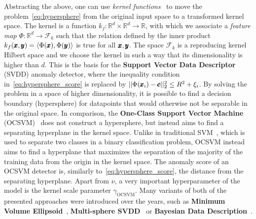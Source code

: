 Abstracting the above, one can use \textit{kernel functions}~\cite{shawe2004kernel} to move the problem~\eqref{eq:hypersphere} from the original input space to a transformed kernel space. The kernel is a function $k_f:\mathbb{R}^d \times \mathbb{R}^d \rightarrow \mathbb{R}$, with which we associate a \textit{feature map} $\Phi: \mathbb{R}^d \rightarrow \mathcal{F}_k$ such that the relation defined by the inner product $k_f(\pmb{{x}},\pmb{{y}})=\langle \Phi(\pmb{{x}}), \Phi(\pmb{{y}}) \rangle$ is true for all $\pmb{{x}},\pmb{{y}}$. The space $\mathcal{F}_k$ is a reproducing kernel Hilbert space and we choose the kernel in such a way that its dimensionality is higher than $d$. This is the basis for the \textbf{Support Vector Data Descriptor} (SVDD) anomaly detector, where the inequality condition in~\eqref{eq:hypersphere_score} is replaced by $\vert \vert \Phi(\pmb{{x}}_i) - \pmb{{c}} \vert \vert_2^2 \leq R^2 + \xi_i$. By solving the problem in a space of higher dimensionality, it is possible to find a decision boundary (hypersphere) for datapoints that would otherwise not be separable in the original space. In comparison, the \textbf{One-Class Support Vector Machine} (OCSVM)~\cite{scholkopf2001estimating} does not construct a hypersphere, but instead aims to find a separating hyperplane in the kernel space. Unlike in traditional SVM~\cite{cortes1995support}, which is used to separate two classes in a binary classification problem, OCSVM instead aims to find a hyperplane that maximizes the separation of the majority of the training data from the origin in the kernel space. The anomaly score of an OCSVM detector is, similarly to~\eqref{eq:hypersphere_score}, the distance from the separating hyperplane. Apart from $\nu$, a very important hyperparameter of the model is the kernel scale parameter $\gamma_{\text{OCSVM}}$. Many variants of both of the presented approaches were introduced over the years, such as \textbf{Minimum Volume Ellipsoid}~\cite{van2009minimum}, \textbf{Multi-sphere SVDD}~\cite{gornitz2017support} or \textbf{Bayesian Data Description}~\cite{ghasemi2012bayesian}.

